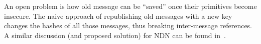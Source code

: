 \documentclass[9pt,sigconf]{acmart}
\begin{document}
An open problem is how old message can be ``saved'' once their primitives become insecure. The naive approach of republishing old messages with a new key changes the hashes of all those messages, thus breaking inter-message references.
A similar discussion (and proposed solution) for NDN can be found in~\cite{DeLorean}.
%
%

%
%



\end{document}
